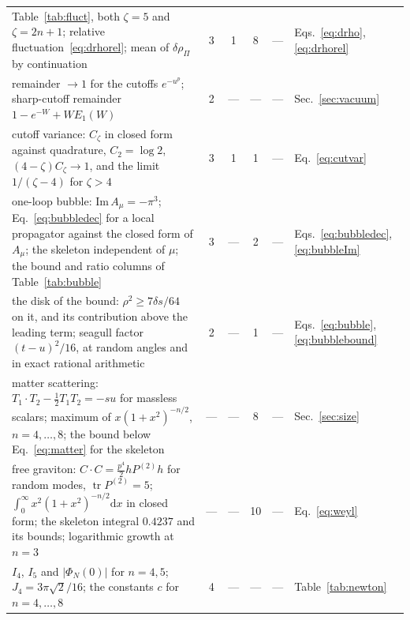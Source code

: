\documentclass[aps,prd,10pt,twocolumn,superscriptaddress,nofootinbib,floatfix,longbibliography]{revtex4-2}
\newcommand{\dd}{\mathrm{d}}
\newcommand{\Pt}{P^{(2)}}
\begin{document}
\begin{table}[tp]
\begin{ruledtabular}
\begin{tabular}{p{10.6cm}ccccl}
Table~\ref{tab:fluct}, both $\zeta=5$ and $\zeta=2n+1$; relative fluctuation~\eqref{eq:drhorel}; mean of $\delta\rho_\Pi$ by continuation & 3 & 1 & 8 & --- & Eqs.~\eqref{eq:drho}, \eqref{eq:drhorel}\\
remainder $\to1$ for the cutoffs $e^{-u^p}$; sharp-cutoff remainder $1-e^{-W}+WE_1(W)$ & 2 & --- & --- & --- & Sec.~\ref{sec:vacuum}\\
cutoff variance: $C_\zeta$ in closed form against quadrature, $C_2=\log2$, $(4-\zeta)C_\zeta\to1$, and the limit $1/(\zeta-4)$ for $\zeta>4$ & 3 & 1 & 1 & --- & Eq.~\eqref{eq:cutvar}\\
one-loop bubble: $\mathrm{Im}\,A_\mu=-\pi^3$; Eq.~\eqref{eq:bubbledec} for a local propagator against the closed form of $A_\mu$; the skeleton independent of $\mu$; the bound and ratio columns of Table~\ref{tab:bubble} & 3 & --- & 2 & --- & Eqs.~\eqref{eq:bubbledec}, \eqref{eq:bubbleIm}\\
the disk of the bound: $\rho^2\ge7\delta s/64$ on it, and its contribution above the leading term; seagull factor $(t-u)^2/16$, at random angles and in exact rational arithmetic & 2 & --- & 1 & --- & Eqs.~\eqref{eq:bubble}, \eqref{eq:bubblebound}\\
matter scattering: $T_1\!\cdot T_2-\frac12T_1T_2=-su$ for massless scalars; maximum of $x(1+x^2)^{-n/2}$, $n=4,\dots,8$; the bound below Eq.~\eqref{eq:matter} for the skeleton & --- & --- & 8 & --- & Sec.~\ref{sec:size}\\
free graviton: $C\cdot C=\frac{p^4}2h\Pt h$ for random modes, $\operatorname{tr}\Pt=5$; $\int_0^\infty x^2(1+x^2)^{-n/2}\dd x$ in closed form; the skeleton integral $0.4237$ and its bounds; logarithmic growth at $n=3$ & --- & --- & 10 & --- & Eq.~\eqref{eq:weyl}\\
$I_4$, $I_5$ and $|\Phi_N(0)|$ for $n=4,5$; $J_4=3\pi\sqrt2/16$; the constants $c$ for $n=4,\dots,8$ & 4 & --- & --- & --- & Table~\ref{tab:newton}\\
\end{tabular}
\end{ruledtabular}
\end{table}
\end{document}
